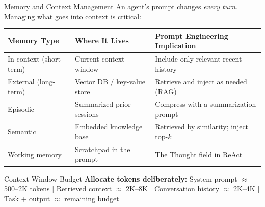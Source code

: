 \documentclass{beamer}
\begin{document}
\begin{frame}{Memory and Context Management}
    An agent's prompt changes \emph{every turn}. Managing what goes into context is critical:

    \vspace{0.2cm}
    \begin{table}
        \centering
        \scriptsize
        \begin{tabular}{@{}lll@{}}
            \toprule
            \textbf{Memory Type} & \textbf{Where It Lives} & \textbf{Prompt Engineering Implication} \\ \midrule
            In-context (short-term) & Current context window & Include only relevant recent history \\
            External (long-term)   & Vector DB / key-value store & Retrieve and inject as needed (RAG) \\
            Episodic               & Summarized prior sessions & Compress with a summarization prompt \\
            Semantic               & Embedded knowledge base  & Retrieved by similarity; inject top-$k$ \\
            Working memory         & Scratchpad in the prompt & The Thought field in ReAct \\ \bottomrule
        \end{tabular}
    \end{table}

    \vspace{0.2cm}
    \begin{block}{Context Window Budget}
        \textbf{Allocate tokens deliberately:}
        System prompt $\approx$ 500--2K tokens $|$
        Retrieved context $\approx$ 2K--8K $|$
        Conversation history $\approx$ 2K--4K $|$
        Task + output $\approx$ remaining budget
    \end{block}
\end{frame}
\end{document}
